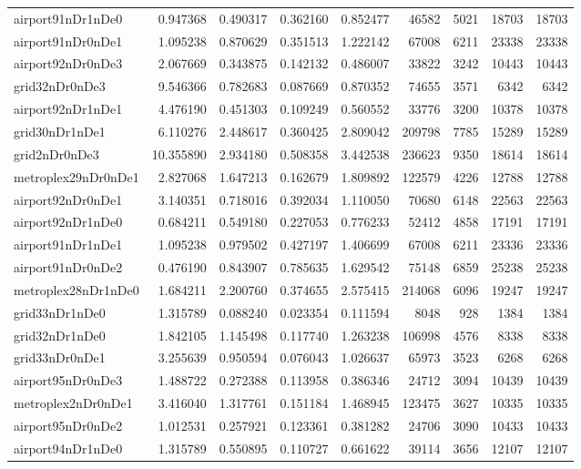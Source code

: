 \begin{longtable}{|l|r|r|r|r|r|r|r|r|}
airport91nDr1nDe0 & 0.947368 & 0.490317 & 0.362160 & 0.852477 & 46582 & 5021 & 18703 & 18703 \\
airport91nDr0nDe1 & 1.095238 & 0.870629 & 0.351513 & 1.222142 & 67008 & 6211 & 23338 & 23338 \\
airport92nDr0nDe3 & 2.067669 & 0.343875 & 0.142132 & 0.486007 & 33822 & 3242 & 10443 & 10443 \\
grid32nDr0nDe3 & 9.546366 & 0.782683 & 0.087669 & 0.870352 & 74655 & 3571 & 6342 & 6342 \\
airport92nDr1nDe1 & 4.476190 & 0.451303 & 0.109249 & 0.560552 & 33776 & 3200 & 10378 & 10378 \\
grid30nDr1nDe1 & 6.110276 & 2.448617 & 0.360425 & 2.809042 & 209798 & 7785 & 15289 & 15289 \\
grid2nDr0nDe3 & 10.355890 & 2.934180 & 0.508358 & 3.442538 & 236623 & 9350 & 18614 & 18614 \\
metroplex29nDr0nDe1 & 2.827068 & 1.647213 & 0.162679 & 1.809892 & 122579 & 4226 & 12788 & 12788 \\
airport92nDr0nDe1 & 3.140351 & 0.718016 & 0.392034 & 1.110050 & 70680 & 6148 & 22563 & 22563 \\
airport92nDr1nDe0 & 0.684211 & 0.549180 & 0.227053 & 0.776233 & 52412 & 4858 & 17191 & 17191 \\
airport91nDr1nDe1 & 1.095238 & 0.979502 & 0.427197 & 1.406699 & 67008 & 6211 & 23336 & 23336 \\
airport91nDr0nDe2 & 0.476190 & 0.843907 & 0.785635 & 1.629542 & 75148 & 6859 & 25238 & 25238 \\
metroplex28nDr1nDe0 & 1.684211 & 2.200760 & 0.374655 & 2.575415 & 214068 & 6096 & 19247 & 19247 \\
grid33nDr1nDe0 & 1.315789 & 0.088240 & 0.023354 & 0.111594 & 8048 & 928 & 1384 & 1384 \\
grid32nDr1nDe0 & 1.842105 & 1.145498 & 0.117740 & 1.263238 & 106998 & 4576 & 8338 & 8338 \\
grid33nDr0nDe1 & 3.255639 & 0.950594 & 0.076043 & 1.026637 & 65973 & 3523 & 6268 & 6268 \\
airport95nDr0nDe3 & 1.488722 & 0.272388 & 0.113958 & 0.386346 & 24712 & 3094 & 10439 & 10439 \\
metroplex2nDr0nDe1 & 3.416040 & 1.317761 & 0.151184 & 1.468945 & 123475 & 3627 & 10335 & 10335 \\
airport95nDr0nDe2 & 1.012531 & 0.257921 & 0.123361 & 0.381282 & 24706 & 3090 & 10433 & 10433 \\
airport94nDr1nDe0 & 1.315789 & 0.550895 & 0.110727 & 0.661622 & 39114 & 3656 & 12107 & 12107 \\

\end{longtable}

